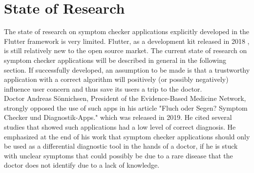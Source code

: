 \section{State of Research}
The state of research on symptom checker applications explicitly developed in the Flutter framework is very limited. Flutter, as a development kit released in 2018 \cite{.flutter}, is still relatively new to the open source market. The current state of research on symptom checker applications will be described in general in the following section.
If successfully developed, an assumption to be made is that a trustworthy application with a correct algorithm will positively (or possibly negatively) influence user concern and thus save its users a trip to the doctor.\\
Doctor Andreas Sönnichsen, President of the Evidence-Based Medicine Network, strongly opposed the use of such apps in his article "Fluch oder Segen? Symptom Checker und Diagnostik-Apps." which was released in 2019. He cited several studies that showed such applications had a low level of correct diagnosis. He emphasized at the end of his work that symptom checker applications should only be used as a differential diagnostic tool in the hands of a doctor, if he is stuck with unclear symptoms that could possibly be due to a rare disease that the doctor does not identify due to a lack of knowledge. \cite{.ebm}\\
